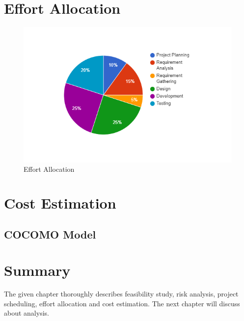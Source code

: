 \section{Effort Allocation}
\begin{figure}[!ht]
    \centering
    \includegraphics[width=\textwidth]{Project Planning and Management/Effort Allocation.png}
    \caption{Effort Allocation}
    \label{fig:my_label}
\end{figure}
    

\section{Cost Estimation}
    \subsection{COCOMO Model}

\section{Summary}
The given chapter thoroughly describes feasibility study, risk analysis, project scheduling, effort allocation and cost estimation. The next chapter will discuss about analysis.

